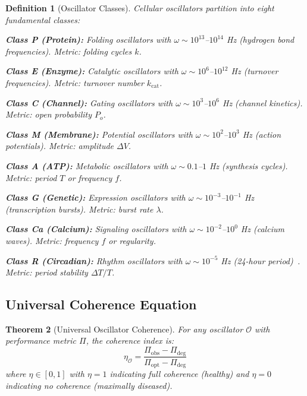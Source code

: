 \documentclass[aps,prd,twocolumn,superscriptaddress,floatfix,nofootinbib]{revtex4-2}
\newtheorem{theorem}{Theorem}[section]
\newtheorem{definition}[theorem]{Definition}
\theoremstyle{remark}
\begin{document}
\begin{definition}[Oscillator Classes]
\label{def:oscillator_classes}
Cellular oscillators partition into eight fundamental classes:

\textbf{Class P (Protein):} Folding oscillators with $\omega \sim 10^{13}$--$10^{14}$ Hz (hydrogen bond frequencies). Metric: folding cycles $k$.

\textbf{Class E (Enzyme):} Catalytic oscillators with $\omega \sim 10^{6}$--$10^{12}$ Hz (turnover frequencies). Metric: turnover number $k_{\mathrm{cat}}$.

\textbf{Class C (Channel):} Gating oscillators with $\omega \sim 10^{3}$--$10^{6}$ Hz (channel kinetics). Metric: open probability $P_o$.

\textbf{Class M (Membrane):} Potential oscillators with $\omega \sim 10^{2}$--$10^{3}$ Hz (action potentials). Metric: amplitude $\Delta V$.

\textbf{Class A (ATP):} Metabolic oscillators with $\omega \sim 0.1$--$1$ Hz (synthesis cycles). Metric: period $T$ or frequency $f$.

\textbf{Class G (Genetic):} Expression oscillators with $\omega \sim 10^{-3}$--$10^{-1}$ Hz (transcription bursts). Metric: burst rate $\lambda$.

\textbf{Class Ca (Calcium):} Signaling oscillators with $\omega \sim 10^{-2}$--$10^{0}$ Hz (calcium waves). Metric: frequency $f$ or regularity.

\textbf{Class R (Circadian):} Rhythm oscillators with $\omega \sim 10^{-5}$ Hz (24-hour period)~\cite{konopka1971,takahashi2017}. Metric: period stability $\Delta T/T$.
\end{definition}

\subsection{Universal Coherence Equation}

\begin{theorem}[Universal Oscillator Coherence]
\label{thm:universal_coherence}
For any oscillator $\mathcal{O}$ with performance metric $\Pi$, the coherence index is:
\begin{equation}
\eta_{\mathcal{O}} = \frac{\Pi_{\mathrm{obs}} - \Pi_{\mathrm{deg}}}{\Pi_{\mathrm{opt}} - \Pi_{\mathrm{deg}}}
\label{eq:universal_coherence}
\end{equation}
where $\eta \in [0, 1]$ with $\eta = 1$ indicating full coherence (healthy) and $\eta = 0$ indicating no coherence (maximally diseased).
\end{theorem}
\end{document}
